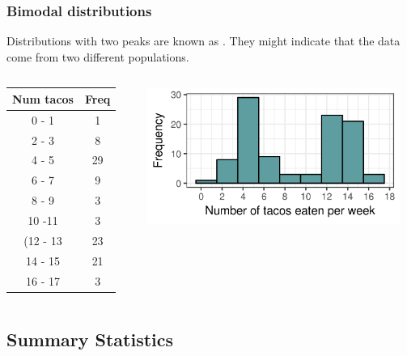 \documentclass[xcolor=table, aspectratio=169, bigger]{beamer}
\begin{document}
\begin{frame}
\frametitle{Bimodal distributions}
\begin{block}{}
Distributions with two peaks are known as . They might indicate that the data come from two different populations.
\end{block}
\pause
\begin{columns}
\begin{column}{0.35\textwidth}
\begin{exampleblock}{}
\begin{center}
\begin{tabular}{cc}
Num tacos & Freq \\
\hline
0 - 1 & 1 \\
2 - 3 & 8 \\
4 - 5 & 29 \\
6 - 7 & 9 \\
8 - 9 & 3 \\
10 -11 & 3 \\
(12 - 13 & 23 \\
14 - 15 & 21 \\
16 - 17 & 3 \\
\end{tabular}
\end{center}
\end{exampleblock}
\end{column}
\pause
\begin{column}{0.65\textwidth}
\begin{center}
\includegraphics[width=3.25in]{../images/wk04_taco_bi_hist}

\end{center}
\end{column}
\end{columns}
\end{frame}








% 
%
\subsection{Summary Statistics}
\end{document}
